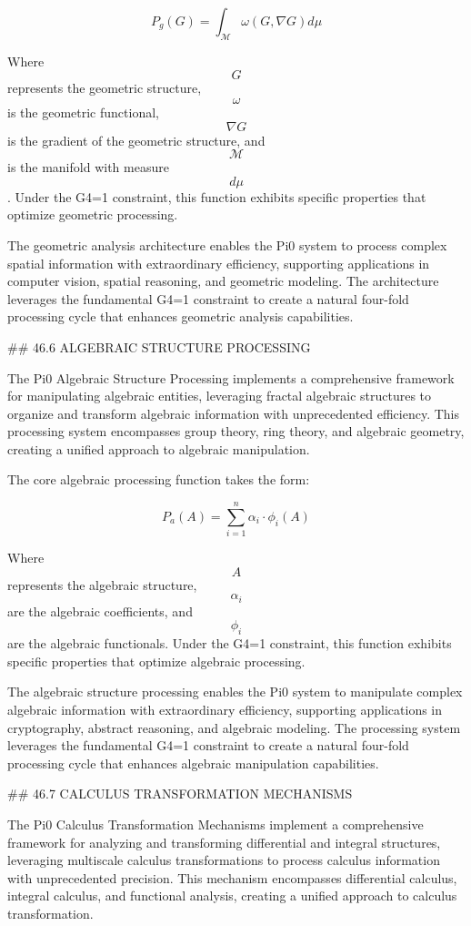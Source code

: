 $$ P_g(G) = \int_{\mathcal{M}} \omega(G, \nabla G) d\mu $$

Where $$ G $$ represents the geometric structure, $$ \omega $$ is the geometric functional, $$ \nabla G $$ is the gradient of the geometric structure, and $$ \mathcal{M} $$ is the manifold with measure $$ d\mu $$. Under the G4=1 constraint, this function exhibits specific properties that optimize geometric processing.

The geometric analysis architecture enables the Pi0 system to process complex spatial information with extraordinary efficiency, supporting applications in computer vision, spatial reasoning, and geometric modeling. The architecture leverages the fundamental G4=1 constraint to create a natural four-fold processing cycle that enhances geometric analysis capabilities.

## 46.6 ALGEBRAIC STRUCTURE PROCESSING

The Pi0 Algebraic Structure Processing implements a comprehensive framework for manipulating algebraic entities, leveraging fractal algebraic structures to organize and transform algebraic information with unprecedented efficiency. This processing system encompasses group theory, ring theory, and algebraic geometry, creating a unified approach to algebraic manipulation.

The core algebraic processing function takes the form:

$$ P_a(A) = \sum_{i=1}^{n} \alpha_i \cdot \phi_i(A) $$

Where $$ A $$ represents the algebraic structure, $$ \alpha_i $$ are the algebraic coefficients, and $$ \phi_i $$ are the algebraic functionals. Under the G4=1 constraint, this function exhibits specific properties that optimize algebraic processing.

The algebraic structure processing enables the Pi0 system to manipulate complex algebraic information with extraordinary efficiency, supporting applications in cryptography, abstract reasoning, and algebraic modeling. The processing system leverages the fundamental G4=1 constraint to create a natural four-fold processing cycle that enhances algebraic manipulation capabilities.

## 46.7 CALCULUS TRANSFORMATION MECHANISMS

The Pi0 Calculus Transformation Mechanisms implement a comprehensive framework for analyzing and transforming differential and integral structures, leveraging multiscale calculus transformations to process calculus information with unprecedented precision. This mechanism encompasses differential calculus, integral calculus, and functional analysis, creating a unified approach to calculus transformation.

